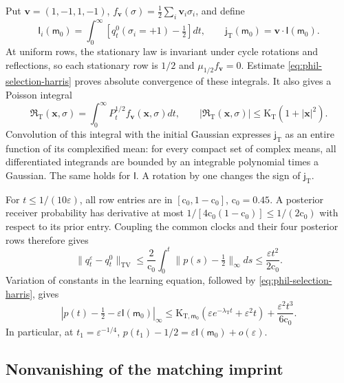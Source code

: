 Put \(\mathbf v=(1,-1,1,-1)\),
\(f_{\mathbf v}(\sigma)=\frac12\sum_i\mathbf v_i\sigma_i\), and define
\begin{equation}
 \mathsf I_i(\mathsf m_0)
 =\int_0^\infty[q_t^0(\sigma_i=+1)-\tfrac12]dt,\qquad
 \mathsf j_{\mathrm T}(\mathsf m_0)
 =\mathbf v\cdot\mathsf I(\mathsf m_0).
\label{eq:phil-selection-imprint}
\end{equation}
At uniform rows, the stationary law is invariant under cycle rotations and
reflections, so each stationary row is \(1/2\) and
\(\mu_{1/2}f_{\mathbf v}=0\). Estimate
\cref{eq:phil-selection-harris} proves absolute convergence of these
integrals. It also gives a Poisson integral
\begin{equation}
 \mathfrak R_{\mathrm T}(\mathbf x,\sigma)
 =\int_0^\infty P_t^{1/2}f_{\mathbf v}(\mathbf x,\sigma)dt,\qquad
 |\mathfrak R_{\mathrm T}(\mathbf x,\sigma)|
 \le\mathrm K_{\mathrm T}(1+|\mathbf x|^2).
\label{eq:phil-selection-poisson}
\end{equation}
Convolution of this integral with the initial Gaussian expresses
\(\mathsf j_{\mathrm T}\) as an entire function of its complexified mean:
for every compact set of complex means, all differentiated integrands are
bounded by an integrable polynomial times a Gaussian. The same holds for
\(\mathsf I\). A rotation by one changes the sign of
\(\mathsf j_{\mathrm T}\).

For \(t\le1/(10\varepsilon)\), all row entries are in
\([\mathrm c_0,1-\mathrm c_0]\), \(\mathrm c_0=0.45\). A posterior receiver probability has derivative
at most \(1/[4\mathrm c_0(1-\mathrm c_0)]\le1/(2\mathrm c_0)\) with respect to its prior entry.
Coupling the common clocks and their four posterior rows therefore gives
\[
 \|q_t^\varepsilon-q_t^0\|_{\mathrm{TV}}
 \le\frac2{\mathrm c_0}\int_0^t\|p(s)-\tfrac12\|_\infty ds
 \le\frac{\varepsilon t^2}{2\mathrm c_0}.
\]
Variation of constants in the learning equation, followed by
\cref{eq:phil-selection-harris}, gives
\begin{equation}
 \left|p(t)-\tfrac12-\varepsilon\mathsf I(\mathsf m_0)\right|_\infty
 \le\mathrm K_{\mathrm T,\mathsf m_0}
       (\varepsilon e^{-\lambda_{\mathrm T}t}+\varepsilon^2t)
       +\frac{\varepsilon^2t^3}{6\mathrm c_0}.
\label{eq:phil-selection-imprint-expansion}
\end{equation}
In particular, at \(t_1=\varepsilon^{-1/4}\),
\(p(t_1)-1/2=\varepsilon\mathsf I(\mathsf m_0)+o(\varepsilon)\).

\subsection*{Nonvanishing of the matching imprint}

